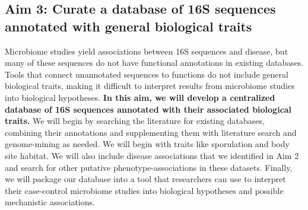 \documentclass[12pt]{article}
\begin{document}

\subsection{Aim 3: Curate a database of 16S sequences annotated with general biological traits}
Microbiome studies yield associations between
16S sequences and disease, but many of these sequences
do not have functional annotations in existing databases. Tools that connect
unannotated sequences to functions do not include
general biological traits, making it difficult to interpret
results from microbiome studies into biological hypotheses.
\textbf{In this aim, we will develop a centralized database of 16S sequences annotated with 
their associated biological traits.}
We will begin
by searching the literature for existing databases, combining their annotations and supplementing them
with literature search and genome-mining as needed. 
We will begin with traits like
sporulation and body site habitat. We will also
include disease associations that we identified in Aim 2 and search
for other putative phenotype-associations in these datasets.
Finally, we will package our database into a tool that researchers can use
to interpret their case-control microbiome studies into biological hypotheses and possible mechanistic associations. 

\end{document}
